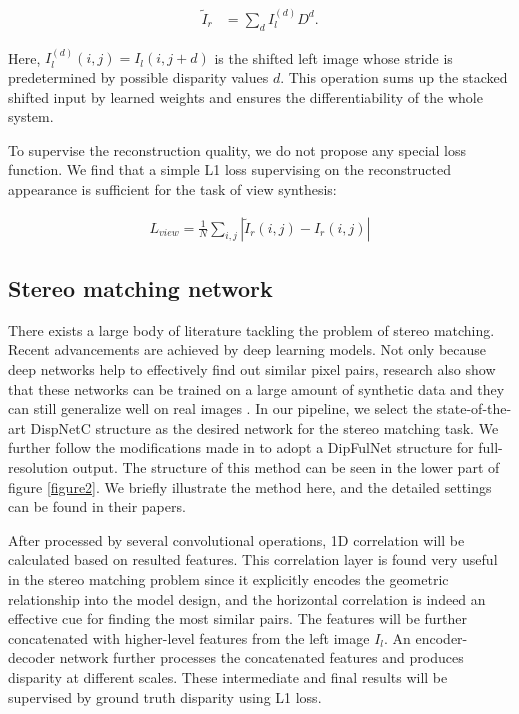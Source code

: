 \documentclass[10pt,twocolumn,letterpaper]{article}
\begin{document}
\vspace{-11pt}
\begin{equation}
\label{selection}
\begin{aligned}
\widetilde{I}_{r}&=\sum_d I_{l}^{(d)}D^d.
\end{aligned}
\end{equation}
\vspace{-9pt}

Here, $I_{l}^{(d)}(i,j) = I_{l}(i,j+d)$ is the shifted left image whose stride is predetermined by possible disparity values $d$. This operation sums up the stacked shifted input by learned weights and ensures the differentiability of the whole system.

To supervise the reconstruction quality, we do not propose any special loss function. We find that a simple L1 loss supervising on the reconstructed appearance is sufficient for the task of view synthesis:

\vspace{-8pt}
\begin{equation}
\label{L1Loss}
\begin{aligned}
L_{view} = \frac{1}{N}\sum_{i,j}\left| \widetilde{I}_{r}(i,j) - I_{r}(i,j)\right|
\end{aligned}
\end{equation}

\subsection{Stereo matching network}
There exists a large body of literature tackling the problem of stereo matching. Recent advancements are achieved by deep learning models. Not only because deep networks help to effectively find out similar pixel pairs, research also show that these networks can be trained on a large amount of synthetic data and they can still generalize well on real images \cite{mayer2016disp}. In our pipeline, we select the state-of-the-art DispNetC \cite{mayer2016disp} structure as the desired network for the stereo matching task. We further follow the modifications made in \cite{pang2017cascade} to adopt a DipFulNet structure for full-resolution output. The structure of this method can be seen in the lower part of figure \ref{figure2}. We briefly illustrate the method here, and the detailed settings can be found in their papers.

After processed by several convolutional operations, 1D correlation will be calculated based on resulted features. This correlation layer is found very useful in the stereo matching problem since it explicitly encodes the geometric relationship into the model design, and the horizontal correlation is indeed an effective cue for finding the most similar pairs. The features will be further concatenated with higher-level features from the left image $I_{l}$. An encoder-decoder network further processes the concatenated features and produces disparity at different scales. These intermediate and final results will be supervised by ground truth disparity using L1 loss. 
\end{document}
